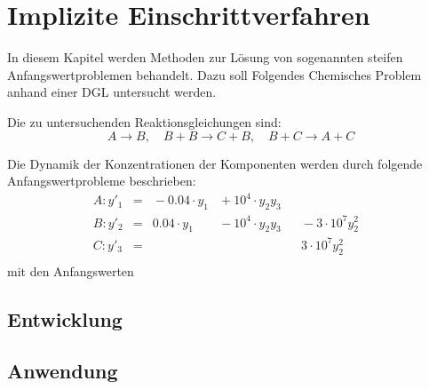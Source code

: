 \chapter{Implizite Einschrittverfahren}
In diesem Kapitel werden Methoden zur Lösung von sogenannten steifen Anfangswertproblemen behandelt. 
Dazu soll Folgendes Chemisches Problem anhand einer DGL untersucht werden.

Die zu untersuchenden Reaktionsgleichungen sind:
\begin{equation}
	A\rightarrow B, \quad B+B \rightarrow C+B, \quad B+C\rightarrow A+C
\end{equation}

Die Dynamik der Konzentrationen der Komponenten werden durch folgende Anfangswertprobleme beschrieben:
\begin{align*}
	A:y'_1&= &{}-0.04\cdot y_1  &{}+ 10^4\cdot y_2y_3& & &\\
	B:y'_2&= & 0.04\cdot y_1  &{}- 10^4\cdot y_2y_3& &{}- 3\cdot 10^7y_2^2 &\\
	C:y'_3&= &                  &                  &  & 3\cdot 10^7y_2^2 &\\
\end{align*}
mit den Anfangswerten 


\section{Entwicklung}
\section{Anwendung}



